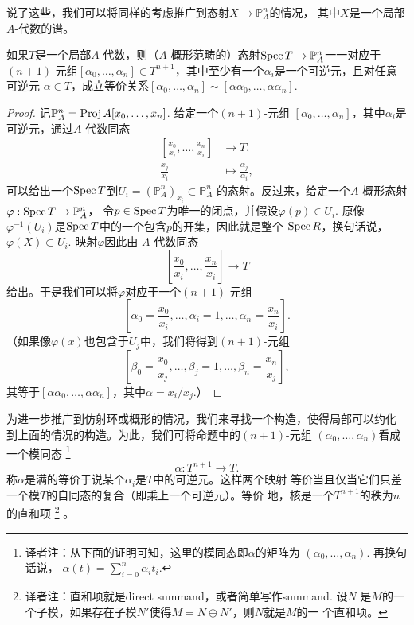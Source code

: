 说了这些，我们可以将同样的考虑推广到态射$X\to \mathbb P^n_A$的情况，
其中$X$是一个局部$A$-代数的谱。

\begin{pro}\label{pro:3.36}
如果$T$是一个局部$A$-代数，则（$A$-概形范畴的）态射$\operatorname{Spec} T\to 
\mathbb P_A^n$一一对应于$(n+1)$-元组$[\alpha_0,\dots,\alpha_n]
\in T^{n+1}$，其中至少有一个$\alpha_i$是一个可逆元，且对任意可逆元
$\alpha\in T$，成立等价关系$[\alpha_0,\dots,\alpha_n]\sim 
[\alpha\alpha_0,\dots,\alpha\alpha_n]$.
\end{pro}

\begin{proof}
记$\mathbb P_A^n=\operatorname{Proj} A[x_0,\dots,x_n]$. 给定一个$(n+1)$-元组
$[\alpha_0,\dots,\alpha_n]$，其中$\alpha_i$是可逆元，通过$A$-代数同态
\begin{align*}
\left[\frac{x_0}{x_i},\dots,\frac{x_n}{x_i}\right]&\longrightarrow T,\\
\frac{x_j}{x_i}&\longmapsto \frac{\alpha_j}{\alpha_i},
\end{align*}
可以给出一个$\operatorname{Spec} T$到$U_i=(\mathbb P_A^n)_{x_i}\subset \mathbb P_A^n$
的态射。反过来，给定一个$A$-概形态射$\varphi:\operatorname{Spec} T\to \mathbb P_A^n$，
令$p\in \operatorname{Spec} T$为唯一的闭点，并假设$\varphi(p)\in U_i$. 原像
$\varphi^{-1}(U_i)$是$\operatorname{Spec} T$中的一个包含$p$的开集，因此就是整个
$\operatorname{Spec} R$，换句话说，$\varphi(X)\subset U_i$. 映射$\varphi$因此由
$A$-代数同态
\[
	\left[\frac{x_0}{x_i},\dots,\frac{x_n}{x_i}\right]\longrightarrow T
\]
给出。于是我们可以将$\varphi$对应于一个$(n+1)$-元组
\[
	\left[\alpha_0=\frac{x_0}{x_i},\dots,\alpha_i=1,\dots,
	\alpha_n=\frac{x_n}{x_i}\right].
\]
（如果像$\varphi(x)$也包含于$U_j$中，我们将得到$(n+1)$-元组
\[
	\left[\beta_0=\frac{x_0}{x_j},\dots,\beta_j=1,\dots,
	\beta_n=\frac{x_n}{x_j}\right],
\]
其等于$[\alpha \alpha_0,\dots,\alpha\alpha_n]$，其中$\alpha=x_i/x_j$.）
\end{proof}

为进一步推广到仿射环或概形的情况，我们来寻找一个构造，使得局部可以约化
到上面的情况的构造。为此，我们可将命题中的$(n+1)$-元组
$(\alpha_0,\dots,\alpha_n)$看成一个模同态%
\footnote{译者注：从下面的证明可知，这里的模同态即$\alpha$的矩阵为
$(\alpha_0,\dots,\alpha_n)$. 再换句话说，
$\alpha(t)=\sum_{i=0}^n\alpha_i t_i$.}%
\[
	\alpha:T^{n+1}\to T.
\]
称$\alpha$是满的等价于说某个$\alpha_i$是$T$中的可逆元。这样两个映射
等价当且仅当它们只差一个模$T$的自同态的复合（即乘上一个可逆元）。等价
地，核是一个$T^{n+1}$的秩为$n$的直和项
\footnote{译者注：直和项就是direct summand，或者简单写作summand. 设$N$
是$M$的一个子模，如果存在子模$N'$使得$M=N\oplus N'$，则$N$就是$M$的一
个直和项。}
。

